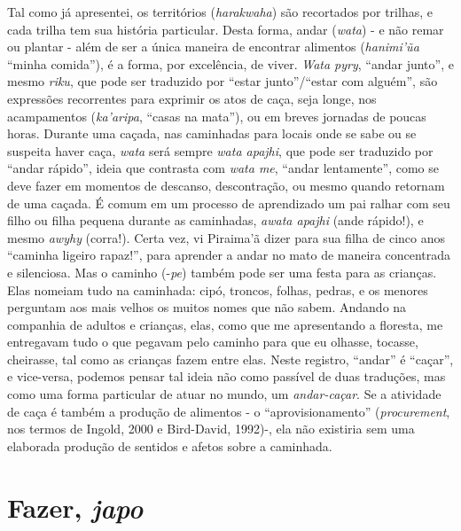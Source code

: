 Tal como já apresentei, os territórios (\emph{harakwaha}) são recortados
por trilhas, e cada trilha tem sua história particular. Desta forma,
andar (\emph{wata}) - e não remar ou plantar - além de ser a única
maneira de encontrar alimentos (\emph{hanimi'ũa} ``minha comida''), é a
forma, por excelência, de viver. \emph{Wata pyry}, ``andar junto'', e
mesmo \emph{riku}, que pode ser traduzido por ``estar junto''/``estar
com alguém'', são expressões recorrentes para exprimir os atos de caça,
seja longe, nos acampamentos (\emph{ka'aripa}, ``casas na mata''), ou em
breves jornadas de poucas horas. Durante uma caçada, nas caminhadas para
locais onde se sabe ou se suspeita haver caça, \emph{wata} será sempre
\emph{wata apajhi}, que pode ser traduzido por ``andar rápido'', ideia
que contrasta com \emph{wata me}, ``andar lentamente'', como se deve
fazer em momentos de descanso, descontração, ou mesmo quando retornam de
uma caçada. É comum em um processo de aprendizado um pai ralhar com seu
filho ou filha pequena durante as caminhadas, \emph{awata apajhi} (ande
rápido!), e mesmo \emph{awyhy} (corra!). Certa vez, vi Piraima'ã dizer
para sua filha de cinco anos ``caminha ligeiro rapaz!'', para aprender a
andar no mato de maneira concentrada e silenciosa. Mas o caminho
(-\emph{pe}) também pode ser uma festa para as crianças. Elas nomeiam
tudo na caminhada: cipó, troncos, folhas, pedras, e os menores perguntam
aos mais velhos os muitos nomes que não sabem. Andando na companhia de
adultos e crianças, elas, como que me apresentando a floresta, me
entregavam tudo o que pegavam pelo caminho para que eu olhasse, tocasse,
cheirasse, tal como as crianças fazem entre elas. Neste registro,
``andar'' é ``caçar'', e vice-versa, podemos pensar tal ideia não como
passível de duas traduções, mas como uma forma particular de atuar no
mundo, um \emph{andar-caçar}. Se a atividade de caça é também a produção
de alimentos - o ``aprovisionamento'' (\emph{procurement}, nos termos de
Ingold, 2000 e Bird-David, 1992)-, ela não existiria sem uma elaborada
produção de sentidos e afetos sobre a caminhada.

\section{Fazer, \emph{japo}}\label{fazer-japo}

